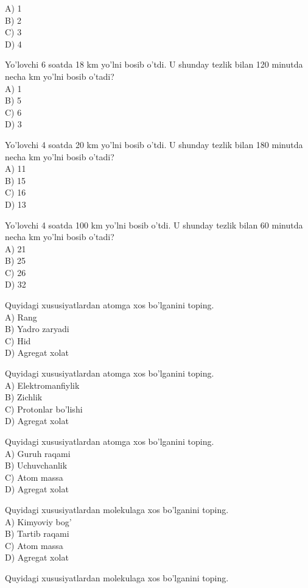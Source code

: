 A) 1\\
B) 2\\
C) 3\\
D) 4
  \item Yo'lovchi 6 soatda 18 km yo'lni bosib o'tdi. U shunday tezlik bilan 120 minutda necha km yo'lni bosib o'tadi?\\
A) 1\\
B) 5\\
C) 6\\
D) 3
  \item Yo'lovchi 4 soatda 20 km yo'lni bosib o'tdi. U shunday tezlik bilan 180 minutda necha km yo'lni bosib o'tadi?\\
A) 11\\
B) 15\\
C) 16\\
D) 13
  \item Yo'lovchi 4 soatda 100 km yo'lni bosib o'tdi. U shunday tezlik bilan 60 minutda necha km yo'lni bosib o'tadi?\\
A) 21\\
B) 25\\
C) 26\\
D) 32
  \item Quyidagi xususiyatlardan atomga xos bo'lganini toping.\\
A) Rang\\
B) Yadro zaryadi\\
C) Hid\\
D) Agregat xolat
  \item Quyidagi xususiyatlardan atomga xos bo'lganini toping.\\
A) Elektromanfiylik\\
B) Zichlik\\
C) Protonlar bo'lishi\\
D) Agregat xolat
  \item Quyidagi xususiyatlardan atomga xos bo'lganini toping.\\
A) Guruh raqami\\
B) Uchuvchanlik\\
C) Atom massa\\
D) Agregat xolat
  \item Quyidagi xususiyatlardan molekulaga xos bo'lganini toping.\\
A) Kimyoviy bog'\\
B) Tartib raqami\\
C) Atom massa\\
D) Agregat xolat
  \item Quyidagi xususiyatlardan molekulaga xos bo'lganini toping.\\
